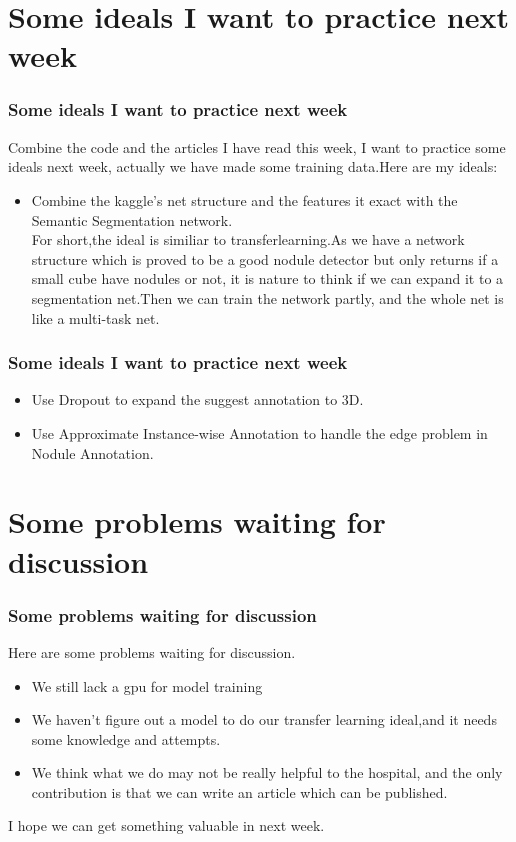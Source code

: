 \documentclass[8pt]{beamer}
\begin{document}
\section*{Some ideals I want to practice next week}	
\begin{frame}[fragile]
\frametitle{Some ideals I want to practice next week}
Combine the code and the articles I have read this week, I want to practice some ideals next week, actually we have made some training data.Here are my ideals:
\begin{itemize}
\item Combine the kaggle's net structure and the features it exact with the Semantic Segmentation network.\\
	\vspace{.3cm}
	For short,the ideal is similiar to transferlearning.As we have a network structure which is proved to be a good nodule detector but only returns if a small cube have nodules or not, it is nature to think if we can expand it to a segmentation net.Then we can train the network partly, and the whole net is like a multi-task net.\\
\end{itemize}
\end{frame}
\begin{frame}[fragile]
\frametitle{Some ideals I want to practice next week}

\begin{itemize}
\item Use Dropout to expand the suggest annotation to 3D.\\ 
\item Use Approximate Instance-wise Annotation to handle the edge problem in Nodule Annotation.\\
\end{itemize}
\end{frame}

\section*{Some problems waiting for discussion}	
\begin{frame}[fragile]
\frametitle{Some problems waiting for discussion}
Here are some problems waiting for discussion.
\begin{itemize}
\item We still lack a gpu for model training
\vspace{.3cm}
\item We haven't figure out a model to do our transfer learning ideal,and it needs some knowledge and attempts.
\vspace{.3cm}
\item We think what we do may not be really helpful to the hospital, and the only contribution is that we can write an article which can be published.
\end{itemize}
I hope we can get something valuable in next week.
\end{frame}


\end{document}
